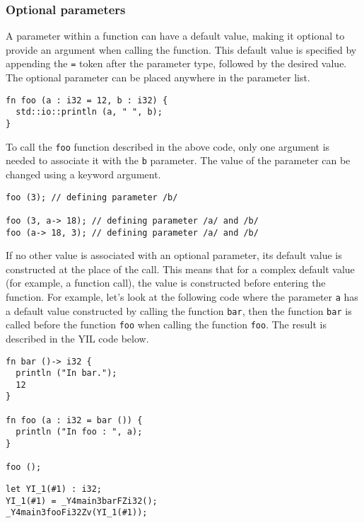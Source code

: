 \subsubsection {Optional parameters}

A parameter within a function can have a default value, making it optional to
provide an argument when calling the function. This default value is specified
by appending the \texttt{=} token after the parameter type, followed by the
desired value. The optional parameter can be placed anywhere in the parameter
list.
\bigskip

\begin{lstlisting}[style=coloredverbatim]
fn foo (a : i32 = 12, b : i32) {
  std::io::println (a, " ", b);
}
\end{lstlisting}

To call the \texttt{foo} function described in the above code, only one argument
is needed to associate it with the \texttt{b} parameter. The value of the
parameter can be changed using a keyword argument.

\begin{lstlisting}[style=coloredverbatim]
foo (3); // defining parameter /b/

foo (3, a-> 18); // defining parameter /a/ and /b/
foo (a-> 18, 3); // defining parameter /a/ and /b/
\end{lstlisting}

If no other value is associated with an optional parameter, its default value is
constructed at the place of the call. This means that for a complex default
value (for example, a function call), the value is constructed before entering
the function. For example, let's look at the following code where the parameter
\texttt{a} has a default value constructed by calling the function \texttt{bar},
then the function \texttt{bar} is called before the function \texttt{foo} when
calling the function \texttt{foo}. The result is described in the YIL code
below.

\begin{lstlisting}[style=coloredverbatim]
fn bar ()-> i32 {
  println ("In bar.");
  12
}

fn foo (a : i32 = bar ()) {
  println ("In foo : ", a);
}

foo ();
\end{lstlisting}

\begin{lstlisting}[style=intermediateVerb]
let YI_1(#1) : i32;
YI_1(#1) = _Y4main3barFZi32();
_Y4main3fooFi32Zv(YI_1(#1));
\end{lstlisting}

